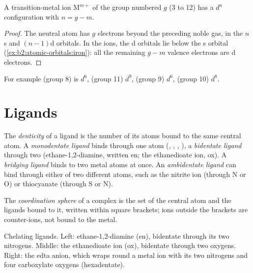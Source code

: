 \begin{proposition}\label{prop:b2:coordination-complexes:dn}
A transition-metal ion $\mathrm M^{m+}$ of the group numbered $g$ (3 to 12) has a $d^n$
configuration with $n = g - m$.
\end{proposition}

\begin{proof}
The neutral atom has $g$ electrons beyond the preceding noble gas, in the $n$s and
$(n - 1)$d orbitals. In the ions, the d orbitals lie below the s orbital
(\cref{ex:b2:atomic-orbitals:iron}): all the remaining $g - m$ valence electrons are d
electrons.
\end{proof}

For example  (group 8) is $d^6$,  (group 11) $d^9$,  (group 9)
$d^6$,  (group 10) $d^8$.

\section{Ligands}

\begin{definition}[Denticity]\label{def:b2:coordination-complexes:denticity}
The \emph{denticity} of a ligand is the number of its atoms bound to
the same central atom. A \emph{monodentate ligand} binds
through one atom (, , , ), a \emph{bidentate
ligand} through two (ethane-1,2-diamine, written en; the
ethanedioate ion, ox). A \emph{bridging ligand} binds to two
metal atoms at once. An \emph{ambidentate ligand} can bind
through either of two different atoms, such as the nitrite ion (through N or O) or
thiocyanate (through S or N).
\end{definition}

\begin{definition}\label{def:b2:coordination-complexes:coordination-sphere}
The \emph{coordination sphere} of a complex is the set of
the central atom and the ligands bound to it, written within square brackets; ions
outside the brackets are counter-ions, not bound to the metal.
\end{definition}

\begin{omfigure}
\qquad
{}
\qquad
{}

\medskip
{\small Chelating ligands. Left: ethane-1,2-diamine (en), bidentate through its two
nitrogens. Middle: the ethanedioate ion (ox), bidentate through two oxygens. Right:
the edta anion, which wraps round a metal ion with its two nitrogens and four
carboxylate oxygens (hexadentate).}
\end{omfigure}

